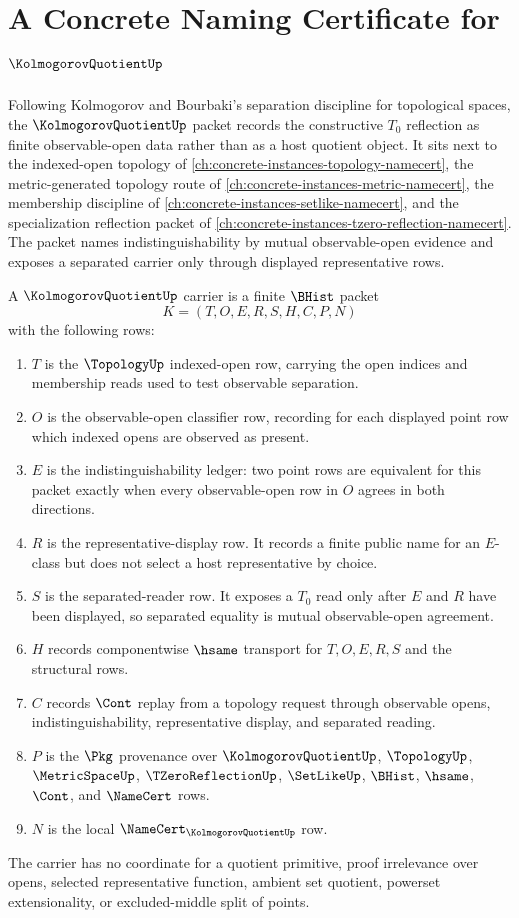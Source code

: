 \chapter{A Concrete Naming Certificate for $\KolmogorovQuotientUp$}
\label{ch:concrete-instances-kolmogorov-quotient-namecert}

Following Kolmogorov and Bourbaki's separation discipline for topological spaces, the $\KolmogorovQuotientUp$ packet records the constructive $T_0$ reflection as finite observable-open data rather than as a host quotient object. It sits next to the indexed-open topology of \autoref{ch:concrete-instances-topology-namecert}, the metric-generated topology route of \autoref{ch:concrete-instances-metric-namecert}, the membership discipline of \autoref{ch:concrete-instances-setlike-namecert}, and the specialization reflection packet of \autoref{ch:concrete-instances-tzero-reflection-namecert}. The packet names indistinguishability by mutual observable-open evidence and exposes a separated carrier only through displayed representative rows.

\begin{definition}
\label{def:kolmogorov-quotient-carrier}
A $\KolmogorovQuotientUp$ carrier is a finite $\BHist$ packet
$$
K=(T,O,E,R,S,H,C,P,N)
$$
with the following rows:
\begin{enumerate}
\item $T$ is the $\TopologyUp$ indexed-open row, carrying the open indices and membership reads used to test observable separation.
\item $O$ is the observable-open classifier row, recording for each displayed point row which indexed opens are observed as present.
\item $E$ is the indistinguishability ledger: two point rows are equivalent for this packet exactly when every observable-open row in $O$ agrees in both directions.
\item $R$ is the representative-display row. It records a finite public name for an $E$-class but does not select a host representative by choice.
\item $S$ is the separated-reader row. It exposes a $T_0$ read only after $E$ and $R$ have been displayed, so separated equality is mutual observable-open agreement.
\item $H$ records componentwise $\hsame$ transport for $T,O,E,R,S$ and the structural rows.
\item $C$ records $\Cont$ replay from a topology request through observable opens, indistinguishability, representative display, and separated reading.
\item $P$ is the $\Pkg$ provenance over $\KolmogorovQuotientUp$, $\TopologyUp$, $\MetricSpaceUp$, $\TZeroReflectionUp$, $\SetLikeUp$, $\BHist$, $\hsame$, $\Cont$, and $\NameCert$ rows.
\item $N$ is the local $\NameCert_{\KolmogorovQuotientUp}$ row.
\end{enumerate}
The carrier has no coordinate for a quotient primitive, proof irrelevance over opens, selected representative function, ambient set quotient, powerset extensionality, or excluded-middle split of points.
\end{definition}

